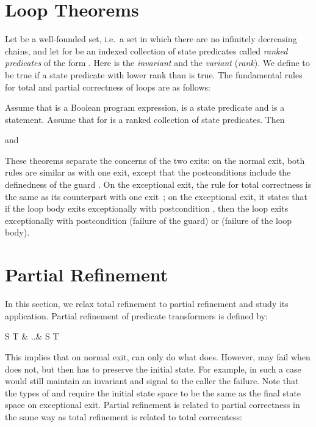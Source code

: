 \documentclass[submission,copyright,creativecommons]{eptcs}
\newcommand{\KW}[1]{\mathop{\sf #1}}
\newcommand{\RAISE}{\KW{raise}}
\newcommand{\defeq}{\left.\widehat{=}\right.}
\newcommand{\trefby}{\sqsubseteq}
\newcommand{\prefby}{\mathbin{\raisebox{.15em}{}\hspace{-.73em}\raisebox{-.3em}{\small}}}
\begin{document}
\section{Loop Theorems}
\label{sec:loop}

Let  be a well-founded set, i.e.~a set in which there are no infinitely decreasing chains, and let  for  be an indexed collection of state predicates called \emph{ranked predicates} of the form . Here  is the \emph{invariant} and  the \emph{variant} (\emph{rank}). We define  to be true if a state predicate with lower rank than  is true. The fundamental rules for total and partial correctness of loops are as follows:

\begin{theorem}
\label{thm:while_corr}
Assume that  is a Boolean program expression,  is a state predicate and  is a statement. Assume that  for  is a ranked collection of state predicates. Then

and

\end{theorem}
These theorems separate the concerns of the two exits: on the normal exit, both rules are similar as with one exit, except that the postconditions include the definedness of the guard . On the exceptional exit, the rule for total correctness is the same as its counterpart with one exit~\cite{BackVonWright98RefinementCalculus}; on the exceptional exit, it states that if the loop body  exits exceptionally with postcondition , then the loop exits exceptionally with postcondition  (failure of the guard) or  (failure of the loop body).

\section{Partial Refinement}
\label{sec:partial}
In this section, we relax total refinement to partial refinement and study its application. Partial refinement of predicate transformers  is defined by:
\begin{eqnarr}
  S \prefby T & \defeq & S \sqcap \RAISE \trefby T
\end{eqnarr}This implies that on normal exit,  can only do what  does. However,  may fail when  does not, but then has to preserve the initial state. For example, in such a case  would still maintain an invariant and signal to the caller the failure. Note that the types of  and  require the initial state space to be the same as the final state space on exceptional exit. Partial refinement is related  to partial correctness in the same way as total refinement is related to total correcntess:
\end{document}
